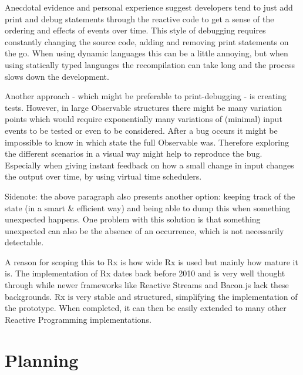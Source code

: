 Anecdotal evidence and personal experience suggest developers tend to
just add print and debug statements through the reactive code to get a
sense of the ordering and effects of events over time.  This style of
debugging requires constantly changing the source code, adding and
removing print statements on the go.  When using dynamic languages this
can be a little annoying, but when using statically typed languages the
recompilation can take long and the process slows down the development.

Another approach - which might be preferable to print-debugging - is
creating tests.  However, in large Observable structures there might be
many variation points which would require exponentially many variations
of (minimal) input events to be tested or even to be considered.  After
a bug occurs it might be impossible to know in which state the full
Observable was.  Therefore exploring the different scenarios in a visual
way might help to reproduce the bug.  Especially when giving instant
feedback on how a small change in input changes the output over time, by
using virtual time schedulers.

Sidenote:  the above paragraph also presents another option:  keeping
track of the state (in a smart \& efficient way) and being able to dump
this when something unexpected happens.  One problem with this solution
is that something unexpected can also be the absence of an occurrence,
which is not necessarily detectable.

A reason for scoping this to Rx is how wide Rx is used but mainly how
mature it is.  The implementation of Rx dates back before 2010 and is
very well thought through while newer frameworks like Reactive Streams
and Bacon.js lack these backgrounds.  Rx is very stable and structured,
simplifying the implementation of the prototype.  When completed, it can
then be easily extended to many other Reactive Programming
implementations.

\section{Planning}

